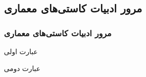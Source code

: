 \label{architectural_problems_literature}

\subsection{مرور ادبیات کاستی‌های معماری}
\begin{frame}
\frametitle{مرور ادبیات کاستی‌های معماری}

\pause
\begin{enumerate}\raggedleft
\begin{RTLitems}
\item
عبارت اولی
\pause
\item
عبارت دومی
\pause
\end{RTLitems}
\end{enumerate}

\end{frame}
